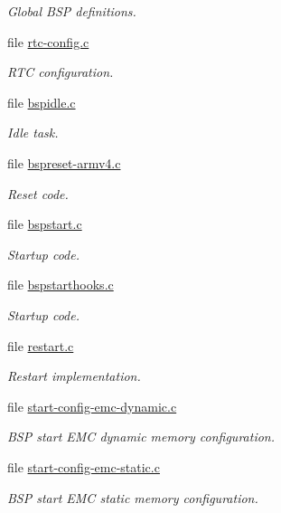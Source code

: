\begin{DoxyCompactItemize}
\begin{DoxyCompactList}\small\item\em Global B\+SP definitions. \end{DoxyCompactList}\item 
file \mbox{\hyperlink{arm_2lpc24xx_2rtc_2rtc-config_8c}{rtc-\/config.\+c}}
\begin{DoxyCompactList}\small\item\em R\+TC configuration. \end{DoxyCompactList}\item 
file \mbox{\hyperlink{arm_2lpc24xx_2start_2bspidle_8c}{bspidle.\+c}}
\begin{DoxyCompactList}\small\item\em Idle task. \end{DoxyCompactList}\item 
file \mbox{\hyperlink{bspreset-armv4_8c}{bspreset-\/armv4.\+c}}
\begin{DoxyCompactList}\small\item\em Reset code. \end{DoxyCompactList}\item 
file \mbox{\hyperlink{arm_2lpc24xx_2start_2bspstart_8c}{bspstart.\+c}}
\begin{DoxyCompactList}\small\item\em Startup code. \end{DoxyCompactList}\item 
file \mbox{\hyperlink{lpc24xx_2start_2bspstarthooks_8c}{bspstarthooks.\+c}}
\begin{DoxyCompactList}\small\item\em Startup code. \end{DoxyCompactList}\item 
file \mbox{\hyperlink{arm_2lpc24xx_2start_2restart_8c}{restart.\+c}}
\begin{DoxyCompactList}\small\item\em Restart implementation. \end{DoxyCompactList}\item 
file \mbox{\hyperlink{start-config-emc-dynamic_8c}{start-\/config-\/emc-\/dynamic.\+c}}
\begin{DoxyCompactList}\small\item\em B\+SP start E\+MC dynamic memory configuration. \end{DoxyCompactList}\item 
file \mbox{\hyperlink{start-config-emc-static_8c}{start-\/config-\/emc-\/static.\+c}}
\begin{DoxyCompactList}\small\item\em B\+SP start E\+MC static memory configuration. \end{DoxyCompactList}\item 

\end{DoxyCompactItemize}
